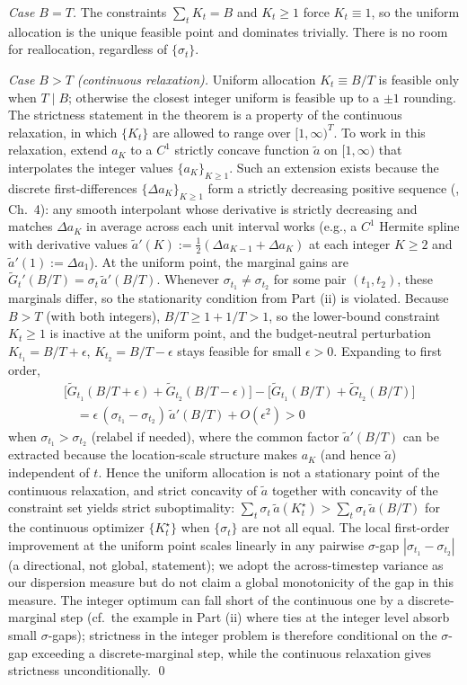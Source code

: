 \emph{Case $B = T$.} The constraints $\sum_t K_t = B$ and $K_t \ge 1$ force $K_t \equiv 1$, so the uniform allocation is the unique feasible point and dominates trivially. There is no room for reallocation, regardless of $\{\sigma_t\}$.

\emph{Case $B > T$ (continuous relaxation).} Uniform allocation $K_t \equiv B/T$ is feasible only when $T \mid B$; otherwise the closest integer uniform is feasible up to a $\pm 1$ rounding. The strictness statement in the theorem is a property of the continuous relaxation, in which $\{K_t\}$ are allowed to range over $[1, \infty)^T$. To work in this relaxation, extend $a_K$ to a $C^1$ strictly concave function $\tilde a$ on $[1, \infty)$ that interpolates the integer values $\{a_K\}_{K \ge 1}$. Such an extension exists because the discrete first-differences $\{\Delta a_K\}_{K \ge 1}$ form a strictly decreasing positive sequence (\citealt{david2003order}, Ch.~4): any smooth interpolant whose derivative is strictly decreasing and matches $\Delta a_K$ in average across each unit interval works (e.g., a $C^1$ Hermite spline with derivative values $\tilde a'(K) := \tfrac12(\Delta a_{K-1} + \Delta a_K)$ at each integer $K \ge 2$ and $\tilde a'(1) := \Delta a_1$). At the uniform point, the marginal gains are $\tilde G_t'(B/T) = \sigma_t\, \tilde a'(B/T)$. Whenever $\sigma_{t_1} \neq \sigma_{t_2}$ for some pair $(t_1, t_2)$, these marginals differ, so the stationarity condition from Part (ii) is violated. Because $B > T$ (with both integers), $B/T \ge 1 + 1/T > 1$, so the lower-bound constraint $K_t \ge 1$ is inactive at the uniform point, and the budget-neutral perturbation $K_{t_1} = B/T + \epsilon$, $K_{t_2} = B/T - \epsilon$ stays feasible for small $\epsilon > 0$. Expanding to first order,
\begin{align*}
  &\bigl[\tilde G_{t_1}(B/T + \epsilon) + \tilde G_{t_2}(B/T - \epsilon)\bigr] - \bigl[\tilde G_{t_1}(B/T) + \tilde G_{t_2}(B/T)\bigr] \\
  &\quad= \epsilon\,(\sigma_{t_1} - \sigma_{t_2})\,\tilde a'(B/T) + O(\epsilon^2) > 0
\end{align*}
when $\sigma_{t_1} > \sigma_{t_2}$ (relabel if needed), where the common factor $\tilde a'(B/T)$ can be extracted because the location-scale structure makes $a_K$ (and hence $\tilde a$) independent of $t$. Hence the uniform allocation is not a stationary point of the continuous relaxation, and strict concavity of $\tilde a$ together with concavity of the constraint set yields strict suboptimality: $\sum_t \sigma_t\,\tilde a(K_t^\star) > \sum_t \sigma_t\,\tilde a(B/T)$ for the continuous optimizer $\{K_t^\star\}$ when $\{\sigma_t\}$ are not all equal. The local first-order improvement at the uniform point scales linearly in any pairwise $\sigma$-gap $|\sigma_{t_1} - \sigma_{t_2}|$ (a directional, not global, statement); we adopt the across-timestep variance as our dispersion measure but do not claim a global monotonicity of the gap in this measure. The integer optimum can fall short of the continuous one by a discrete-marginal step (cf.\ the example in Part (ii) where ties at the integer level absorb small $\sigma$-gaps); strictness in the integer problem is therefore conditional on the $\sigma$-gap exceeding a discrete-marginal step, while the continuous relaxation gives strictness unconditionally. \qed
%
